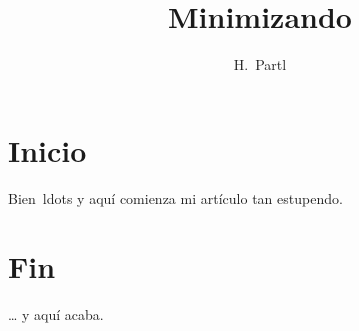 \documentclass[a4paper,11pt]{article}
\author{H.~Partl}
\title{Minimizando}
\begin{document}
   \maketitle
   \tableofcontents
   \section{Inicio}
   Bien\ ldots{} y aqu\'i comienza mi art\'iculo tan estupendo.\section{Fin}
   \ldots{} y aqu\'i acaba.
\end{document}
